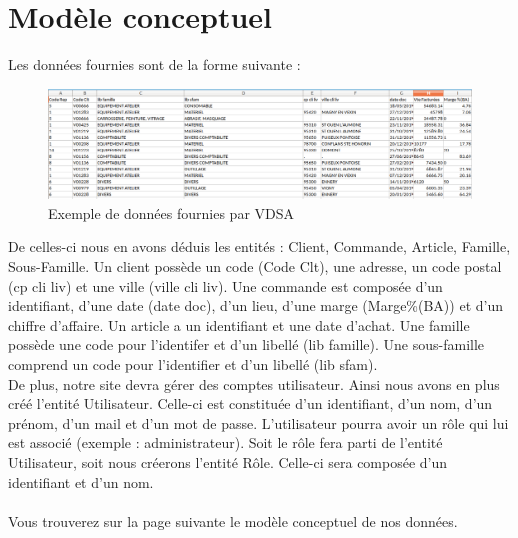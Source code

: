 \section{Modèle conceptuel}

Les données fournies sont de la forme suivante : \\
\begin{figure}[h]
	\begin{center}
		\includegraphics[scale=0.35]{img/data.png}
		\caption{Exemple de données fournies par VDSA}
	\end{center}
\end{figure}

De celles-ci nous en avons déduis les entités : Client, Commande, Article, Famille, Sous-Famille.
Un client possède un code (Code Clt), une adresse, un code postal (cp cli liv) et une ville (ville cli liv). Une commande est composée d'un identifiant, d'une date (date doc), d'un lieu, d'une marge (Marge\%(BA)) et d'un chiffre d'affaire. Un article a un identifiant et une date d'achat. Une famille possède une code pour l'identifer et d'un libellé (lib famille). Une sous-famille comprend un code pour l'identifier et d'un libellé (lib sfam).\\
De plus, notre site devra gérer des comptes utilisateur. Ainsi nous avons en plus créé l'entité Utilisateur. Celle-ci est constituée d'un identifiant, d'un nom, d'un prénom, d'un mail et d'un mot de passe. L'utilisateur pourra avoir un rôle qui lui est associé (exemple : administrateur). Soit le rôle fera parti de l'entité Utilisateur, soit nous créerons l'entité Rôle. Celle-ci sera composée d'un identifiant et d'un nom.\\ \\
\noindent
Vous trouverez sur la page suivante le modèle conceptuel de nos données.

